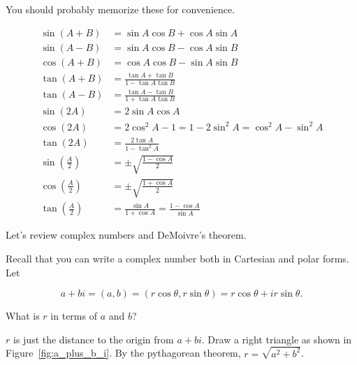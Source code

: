 \documentclass[../gatm_answers.tex]{subfiles}
\begin{document}
\noindent You should probably memorize these for convenience.

\renewcommand{\arraystretch}{1.1}
\begin{align*}
\sin(A+B)&= \sin A \cos B + \cos A \sin A \\
\sin(A-B) &= \sin A \cos B - \cos A \sin B \\
\cos(A+B) &= \cos A \cos B - \sin A \sin B \\
\tan(A+B)&= \frac{\tan A + \tan B}{1-\tan A\tan B}\\
\tan(A-B) &= \frac{\tan A - \tan B}{1+\tan A\tan B}\\
\sin(2A) &= 2\sin A\cos A\\
\cos(2A)&= 2\cos^2 A - 1 = 1 - 2\sin^2 A = \cos^2 A - \sin^2 A \\
\tan(2A) &= \frac{2\tan A}{1-\tan^2 A}\\
\sin\left(\frac{A}{2}\right) &= \pm\sqrt{\frac{1-\cos A}{2}}\\
\cos\left(\frac{A}{2}\right)&= \pm\sqrt{\frac{1+\cos A}{2}}\\
\tan\left(\frac{A}{2}\right) &= \frac{\sin A}{1+\cos A} = \frac{1-\cos A}{\sin A}
\end{align*}

\begin{outer_problem}
\item Let's review complex numbers and DeMoivre's theorem.
\end{outer_problem}

\begin{inner_problem}[start=1]
\item Recall that you can write a complex number both in Cartesian and polar forms. Let

$$a+bi=(a,b)=(r\cos\theta,r\sin\theta)=r\cos\theta+ir\sin\theta.$$

What is $r$ in terms of $a$ and $b$?
\end{inner_problem}

\noindent $r$ is just the distance to the origin from $a+bi$. Draw a right triangle as shown in Figure~\ref{fig:a_plus_b_i}. By the pythagorean theorem, $r=\sqrt{a^2+b^2}$.
\end{document}
